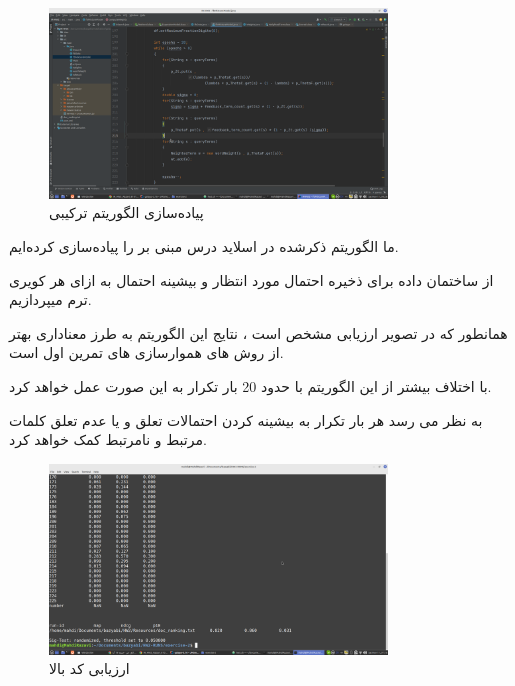 \begin{figure}[h]
    \centering
    \includegraphics[width=0.8\textwidth]{IR2/images/exercise2-code.png}
    \caption{پیاده‌سازی الگوریتم ترکیبی}
    \label{fig:enter-label}
\end{figure}



\begin{boxC}
    ما الگوریتم ذکرشده در اسلاید درس مبنی بر 
    را پیاده‌سازی کرده‌ایم.

    از ساختمان داده 
    برای ذخیره احتمال مورد انتظار و بیشینه احتمال به ازای هر کویری ترم میپردازیم.

    همانطور که در تصویر ارزیابی مشخص است ، نتایج این الگوریتم به طرز معناداری بهتر از روش های هموارسازی های تمرین اول است.

    با اختلاف بیشتر از 
    این الگوریتم با حدود 20 بار تکرار به این صورت عمل خواهد کرد.

    به نظر می رسد هر بار تکرار به بیشینه کردن احتمالات تعلق و یا عدم تعلق کلمات مرتبط و نامرتبط کمک خواهد کرد.
\end{boxC}

\begin{figure}[h]
    \centering
    \includegraphics[width=0.8\textwidth]{IR2/images/exercise-2.png}
    \caption{ارزیابی کد بالا}
    \label{fig:enter-label}
\end{figure}

\newpage